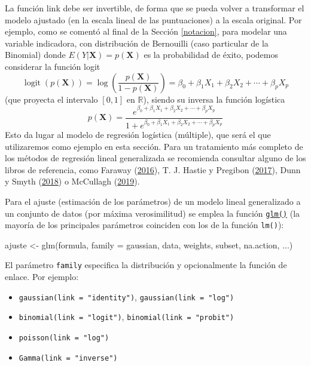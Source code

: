 \documentclass[
]{book}
\newenvironment{Shaded}{\begin{snugshade}}{\end{snugshade}}
\newcommand{\AttributeTok}[1]{\textcolor[rgb]{0.77,0.63,0.00}{#1}}
\newcommand{\FunctionTok}[1]{\textcolor[rgb]{0.00,0.00,0.00}{#1}}
\newcommand{\NormalTok}[1]{#1}
\newcommand{\OtherTok}[1]{\textcolor[rgb]{0.56,0.35,0.01}{#1}}
\theoremstyle{break}
\theoremstyle{nonumberplain}
\begin{document}
La función link debe ser invertible, de forma que se pueda volver a transformar el modelo ajustado (en la escala lineal de las puntuaciones) a la escala original.
Por ejemplo, como se comentó al final de la Sección \ref{notacion}, para modelar una variable indicadora, con distribución de Bernouilli (caso particular de la Binomial) donde \(E(Y | \mathbf{X} ) = p(\mathbf{X})\) es la probabilidad de éxito, podemos considerar la función logit
\[\operatorname{logit}(p(\mathbf{X}))=\log\left( \frac{p(\mathbf{X})}{1-p(\mathbf{X})} \right) = \beta_{0}+\beta_{1}X_{1}+\beta_{2}X_{2}+\cdots+\beta_{p}X_{p}\]
(que proyecta el intervalo \([0, 1]\) en \(\mathbb{R}\)), siendo su inversa la función logística
\[p(\mathbf{X}) = \frac{e^{\beta_{0}+\beta_{1}X_{1}+\beta_{2}X_{2}+\cdots+\beta_{p}X_{p}}}{1 + e^{\beta_{0}+\beta_{1}X_{1}+\beta_{2}X_{2}+\cdots+\beta_{p}X_{p}}}\]
Esto da lugar al modelo de regresión logística (múltiple), que será el que utilizaremos como ejemplo en esta sección.
Para un tratamiento más completo de los métodos de regresión lineal generalizada se recomienda consultar alguno de los libros de referencia, como Faraway (\protect\hyperlink{ref-faraway2014linear}{2016}), T. J. Hastie y Pregibon (\protect\hyperlink{ref-hastie2017generalized}{2017}), Dunn y Smyth (\protect\hyperlink{ref-dunn2018generalized}{2018}) o McCullagh (\protect\hyperlink{ref-mccullagh2019generalized}{2019}).

Para el ajuste (estimación de los parámetros) de un modelo lineal generalizado a un conjunto de datos (por máxima verosimilitud) se emplea la función \href{https://rdrr.io/r/stats/glm.html}{\texttt{glm()}} (la mayoría de los principales parámetros coinciden con los de la función \texttt{lm()}):

\begin{Shaded}
\begin{Highlighting}[]
\NormalTok{ajuste }\OtherTok{\textless{}{-}} \FunctionTok{glm}\NormalTok{(formula, }\AttributeTok{family =}\NormalTok{ gaussian, data, weights, subset, na.action, ...)}
\end{Highlighting}
\end{Shaded}

El parámetro \texttt{family} especifica la distribución y opcionalmente la función de enlace.
Por ejemplo:

\begin{itemize}
\item
  \texttt{gaussian(link\ =\ "identity")}, \texttt{gaussian(link\ =\ "log")}
\item
  \texttt{binomial(link\ =\ "logit")}, \texttt{binomial(link\ =\ "probit")}
\item
  \texttt{poisson(link\ =\ "log")}
\item
  \texttt{Gamma(link\ =\ "inverse")}
\end{itemize}
\end{document}
